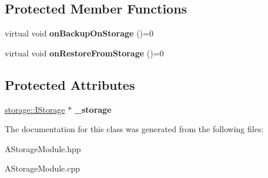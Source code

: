 \subsection*{Protected Member Functions}
\begin{DoxyCompactItemize}
\item 
\mbox{\label{classwood_box_1_1module_1_1_a_storage_module_ab105f7ff761ca9e4039fa1ee646cb8f6}} 
virtual void {\bfseries on\+Backup\+On\+Storage} ()=0
\item 
\mbox{\label{classwood_box_1_1module_1_1_a_storage_module_a6a2d3241b4424546eae140d217146ad8}} 
virtual void {\bfseries on\+Restore\+From\+Storage} ()=0
\end{DoxyCompactItemize}
\subsection*{Protected Attributes}
\begin{DoxyCompactItemize}
\item 
\mbox{\label{classwood_box_1_1module_1_1_a_storage_module_ae9cc061f39337adb2b134e9ea378daa1}} 
\mbox{\hyperlink{classwood_box_1_1storage_1_1_i_storage}{storage\+::\+I\+Storage}} $\ast$ {\bfseries \+\_\+storage}
\end{DoxyCompactItemize}


The documentation for this class was generated from the following files\+:\begin{DoxyCompactItemize}
\item 
A\+Storage\+Module.\+hpp\item 
A\+Storage\+Module.\+cpp\end{DoxyCompactItemize}
